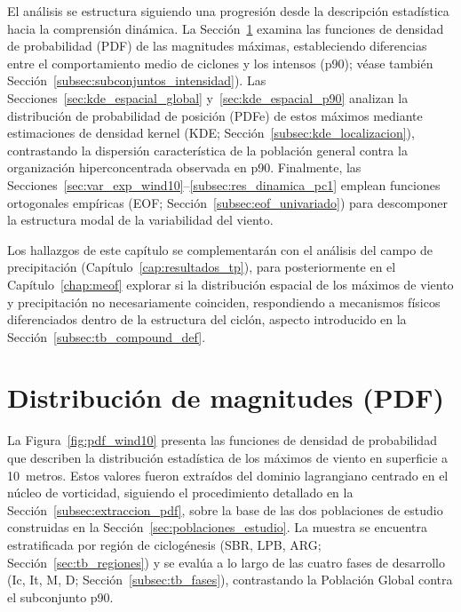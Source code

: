 El análisis se estructura siguiendo una progresión desde la descripción estadística hacia la comprensión dinámica. 
La Sección~\ref{sec:pdf_wind10} examina las funciones de densidad de probabilidad (PDF) de las magnitudes máximas, estableciendo diferencias entre el comportamiento medio de ciclones y los intensos (p90); véase también Sección~\ref{subsec:subconjuntos_intensidad}). 
Las Secciones~\ref{sec:kde_espacial_global} y~\ref{sec:kde_espacial_p90} analizan la distribución de probabilidad de posición (PDFe) de estos máximos mediante estimaciones de densidad kernel (KDE; Sección~\ref{subsec:kde_localizacion}), contrastando la dispersión característica de la población general contra la organización hiperconcentrada observada en p90. 
Finalmente, las Secciones~\ref{sec:var_exp_wind10}--\ref{subsec:res_dinamica_pc1} emplean funciones ortogonales empíricas (EOF; Sección~\ref{subsec:eof_univariado}) para descomponer la estructura modal de la variabilidad del viento.

Los hallazgos de este capítulo se complementarán con el análisis del campo de precipitación (Capítulo~\ref{cap:resultados_tp}), para posteriormente en el Capítulo~\ref{chap:meof} explorar si la distribución espacial de los máximos de viento y precipitación no necesariamente coinciden, respondiendo a mecanismos físicos diferenciados dentro de la estructura del ciclón, aspecto introducido en la Sección~\ref{subsec:tb_compound_def}.


\section{Distribución de magnitudes (PDF)}\label{sec:pdf_wind10}

La Figura~\ref{fig:pdf_wind10} presenta las funciones de densidad de probabilidad que describen la distribución estadística de los máximos de viento en superficie a 10~metros. 
Estos valores fueron extraídos del dominio lagrangiano centrado en el núcleo de vorticidad, siguiendo el procedimiento detallado en la Sección~\ref{subsec:extraccion_pdf}, sobre la base de las dos poblaciones de estudio construidas en la Sección~\ref{sec:poblaciones_estudio}. 
La muestra se encuentra estratificada por región de ciclogénesis (SBR, LPB, ARG; Sección~\ref{sec:tb_regiones}) y se evalúa a lo largo de las cuatro fases de desarrollo (Ic, It, M, D; Sección~\ref{subsec:tb_fases}), contrastando la Población Global contra el subconjunto p90.

